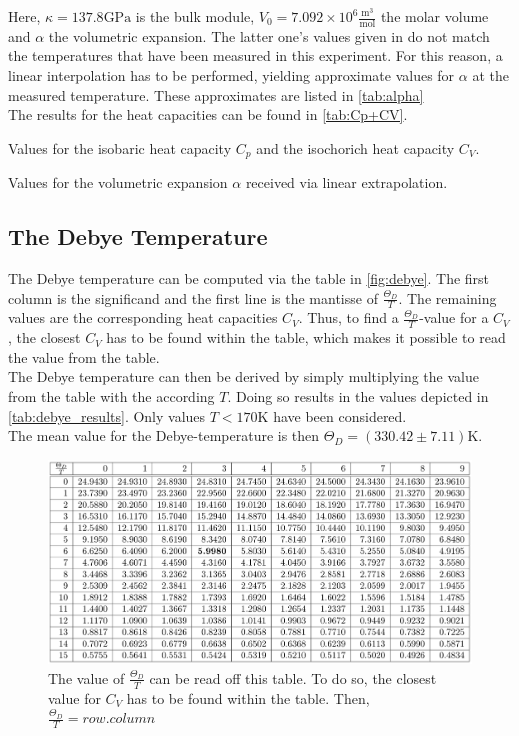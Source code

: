 Here, $\kappa = 137.8 \text{GPa}$ is the bulk module, $V_0 = 7.092 \times 10^6 \frac{\text{m}^3}{\text{mol}}$ the molar volume and $\alpha$ the volumetric expansion. The latter one's values given in \cite{Anleitung47} do not match the temperatures that have been measured in this experiment. For this reason, a linear interpolation has to be performed, yielding approximate values for $\alpha$ at the measured temperature. These approximates are listed in \autoref{tab:alpha}\\
The results for the heat capacities can be found in \autoref{tab:Cp+CV}.
\begin{table}
  \centering
  
  \caption{Values for the isobaric heat capacity $C_p$ and the isochorich heat capacity $C_V$.}
  \label{tab:Cp+CV}
\end{table}
\begin{table}
  \centering
  
  \caption{Values for the volumetric expansion $\alpha$ received via linear extrapolation.}
  \label{tab:alpha}
\end{table}

\subsection{The Debye Temperature}
The Debye temperature can be computed via the table in \autoref{fig:debye}. The first column is the significand and the first line is the mantisse of $\frac{\Theta_D}{T}$. The remaining values are the corresponding heat capacities $C_V$. Thus, to find a $\frac{\Theta_D}{T}$-value for a $C_V$, the closest $C_V$ has to be found within the table, which makes it possible to read the value from the table.\\
The Debye temperature can then be derived by simply multiplying the value from the table with the according $T$. Doing so results in the values depicted in \autoref{tab:debye_results}. Only values $T<170\text{K}$ have been considered.\\
The mean value for the Debye-temperature is then $\Theta_D = (330.42 \pm 7.11) \text{K}$.
\begin{figure}[h!]
  \centering
  \includegraphics[width=\textwidth]{figures/Debye_values.png}
  \caption{The value of $\frac{\Theta_D}{T}$ can be read off this table. To do so, the closest value for $C_V$ has to be found within the table. Then, $\frac{\Theta_D}{T} = \textit{row}.\textit{column}$}
  \label{fig:debye}
\end{figure}


